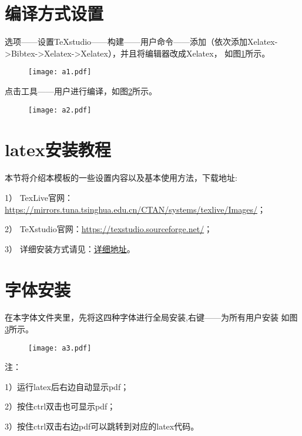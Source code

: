 \documentclass{standalone}
\begin{document}
\section{编译方式设置}
选项——设置TeXstudio——构建——用户命令——添加（依次添加Xelatex->Bibtex->Xelatex->Xelatex），并且将编辑器改成Xelatex，
如图\ref{fig_0}所示。

\begin{figure}[htbp]
	\centering
	\texttt{[image: a1.pdf]}
	\label{fig_0}
\end{figure}

点击工具——用户进行编译，如图\ref{fig_1}所示。

\begin{figure}[htbp]
	\centering
	\texttt{[image: a2.pdf]}
	\label{fig_1}
\end{figure}

\section{latex安装教程}
本节将介绍本模板的一些设置内容以及基本使用方法，下载地址:

1） TexLive官网：\href{https://mirrors.tuna.tsinghua.edu.cn/CTAN/systems/texlive/Images/}{https://mirrors.tuna.tsinghua.edu.cn/CTAN/systems/texlive/Images/}；

2） TeXstudio官网：\href{https://texstudio.sourceforge.net/}{https://texstudio.sourceforge.net/}；

3）
 详细安装方式请见：\href{https://blog.csdn.net/weixin_43872190/article/details/113736283?spm=1001.2014.3001.5502}{详细地址}。


\section{字体安装}
在本字体文件夹里，先将这四种字体进行全局安装,右键——为所有用户安装
如图\ref{fig_2}所示。

{\tiny \begin{figure}[htbp]
	\centering
	\texttt{[image: a3.pdf]}
	\label{fig_2}
\end{figure}}

注：

1）运行latex后右边自动显示pdf；

2）按住ctrl双击也可显示pdf；

3）按住ctrl双击右边pdf可以跳转到对应的latex代码。
\end{document}
